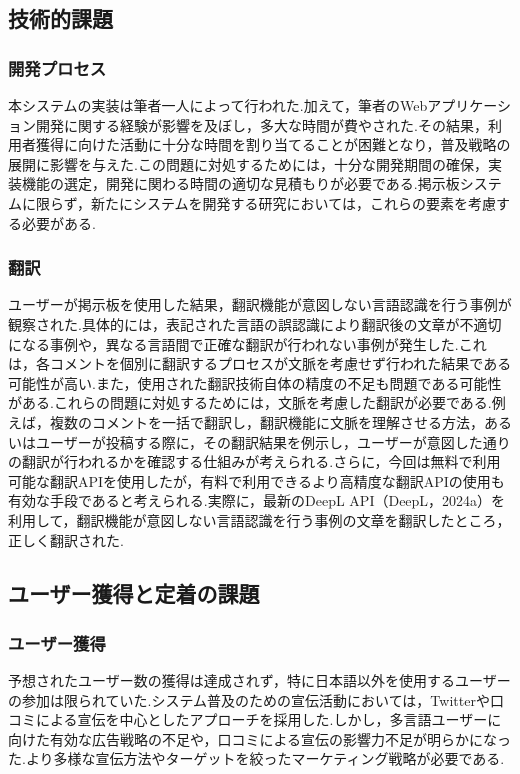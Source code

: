 \documentclass[b5paper,12pt,dvipdfmx]{jsreport}
\begin{document}
\subsection{技術的課題}

\subsubsection{開発プロセス}
本システムの実装は筆者一人によって行われた.加えて，筆者のWebアプリケーション開発に関する経験が影響を及ぼし，多大な時間が費やされた.その結果，利用者獲得に向けた活動に十分な時間を割り当てることが困難となり，普及戦略の展開に影響を与えた.この問題に対処するためには，十分な開発期間の確保，実装機能の選定，開発に関わる時間の適切な見積もりが必要である.掲示板システムに限らず，新たにシステムを開発する研究においては，これらの要素を考慮する必要がある.

\subsubsection{翻訳}
ユーザーが掲示板を使用した結果，翻訳機能が意図しない言語認識を行う事例が観察された.具体的には，表記された言語の誤認識により翻訳後の文章が不適切になる事例や，異なる言語間で正確な翻訳が行われない事例が発生した.これは，各コメントを個別に翻訳するプロセスが文脈を考慮せず行われた結果である可能性が高い.また，使用された翻訳技術自体の精度の不足も問題である可能性がある.これらの問題に対処するためには，文脈を考慮した翻訳が必要である.例えば，複数のコメントを一括で翻訳し，翻訳機能に文脈を理解させる方法，あるいはユーザーが投稿する際に，その翻訳結果を例示し，ユーザーが意図した通りの翻訳が行われるかを確認する仕組みが考えられる.さらに，今回は無料で利用可能な翻訳APIを使用したが，有料で利用できるより高精度な翻訳APIの使用も有効な手段であると考えられる.実際に，最新のDeepL API（DeepL，2024a）を利用して，翻訳機能が意図しない言語認識を行う事例の文章を翻訳したところ，正しく翻訳された.


\subsection{ユーザー獲得と定着の課題}

\subsubsection{ユーザー獲得}
予想されたユーザー数の獲得は達成されず，特に日本語以外を使用するユーザーの参加は限られていた.システム普及のための宣伝活動においては，Twitterや口コミによる宣伝を中心としたアプローチを採用した.しかし，多言語ユーザーに向けた有効な広告戦略の不足や，口コミによる宣伝の影響力不足が明らかになった.より多様な宣伝方法やターゲットを絞ったマーケティング戦略が必要である.
\end{document}
